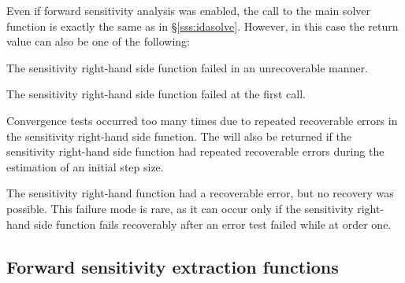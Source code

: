 Even if forward sensitivity analysis was enabled, the call to the main solver 
function  is exactly the same as in \S\ref{sss:idasolve}. However, in this
case the return value  can also be one of the following:
\begin{args}
\item[\Id{IDA\_SRHSFUNC\_FAIL}]
  The sensitivity right-hand side function failed in an unrecoverable manner.
\item[\Id{IDA\_FIRST\_SRHSFUNC\_FAIL}]
  The sensitivity right-hand side function failed at the first call.
\item[\Id{IDA\_REPTD\_SRHSFUNC\_ERR}]
  Convergence tests occurred too many times due to repeated recoverable errors in
  the sensitivity right-hand side function. The  will also
  be returned if the sensitivity right-hand side function had repeated recoverable errors
  during the estimation of an initial step size.
\item[\Id{IDA\_UNREC\_SRHSFUNC\_ERR}]
  The sensitivity right-hand function had a recoverable error, but no recovery was possible.
  This failure mode is rare, as it can occur only if the sensitivity right-hand side function
  fails recoverably after an error test failed while at order one.
\end{args}


\subsection{Forward sensitivity extraction functions}\label{ss:sensi_get}

